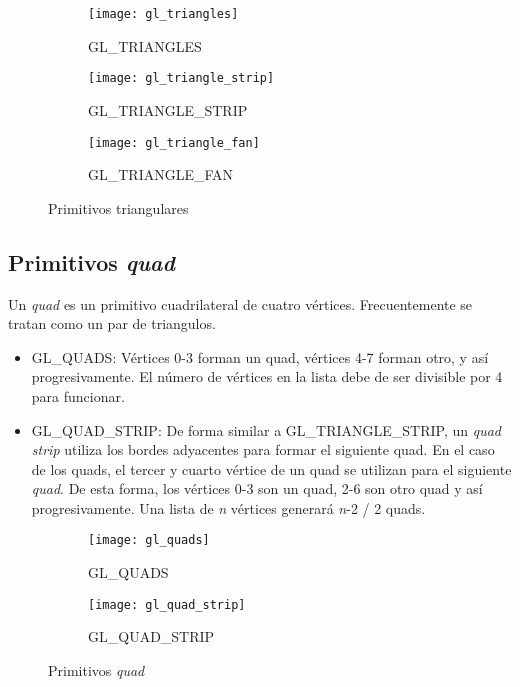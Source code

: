 \begin{figure} [ht]
  \centering
  \captionsetup[subfigure]{justification=centering}
  \begin{subfigure} {0.3\textwidth}
    \texttt{[image: gl\_triangles]}
    \caption{GL\_TRIANGLES}
  \end{subfigure}
  \begin{subfigure} {0.3\textwidth}
    \texttt{[image: gl\_triangle\_strip]}
    \caption{GL\_TRIANGLE\_STRIP}
  \end{subfigure}
  \begin{subfigure} {0.3\textwidth}
    \texttt{[image: gl\_triangle\_fan]}
    \caption{GL\_TRIANGLE\_FAN}
  \end{subfigure}
  \caption{Primitivos triangulares}
\end{figure}

\subsection{Primitivos \textit{quad}}
Un \textit{quad} es un primitivo cuadrilateral de cuatro vértices. Frecuentemente se tratan como un par de triangulos.
\begin{itemize}
\item{GL\_QUADS: Vértices 0-3 forman un quad, vértices 4-7 forman otro, y así progresivamente. El número de vértices en la lista debe de ser divisible por 4 para funcionar.}
\item{GL\_QUAD\_STRIP: De forma similar a GL\_TRIANGLE\_STRIP, un \textit{quad strip} utiliza los bordes adyacentes para formar el siguiente quad. En el caso de los quads, el tercer y cuarto vértice de un quad se utilizan para el siguiente \textit{quad}. De esta forma, los vértices 0-3 son un quad, 2-6 son otro quad y así progresivamente. Una lista de \textit{n} vértices generará \textit{n}-2 / 2 quads.}
\end{itemize}

\begin{figure} [h]
  \centering
  \captionsetup[subfigure]{justification=centering}
  \begin{subfigure}{0.3\textwidth} 
    \texttt{[image: gl\_quads]} 
    \caption{GL\_QUADS}
  \end{subfigure}
  \begin{subfigure}{0.3\textwidth}
    \texttt{[image: gl\_quad\_strip]} 
    \caption{GL\_QUAD\_STRIP}
  \end{subfigure}
  \caption{Primitivos \textit{quad}}
\end{figure}

